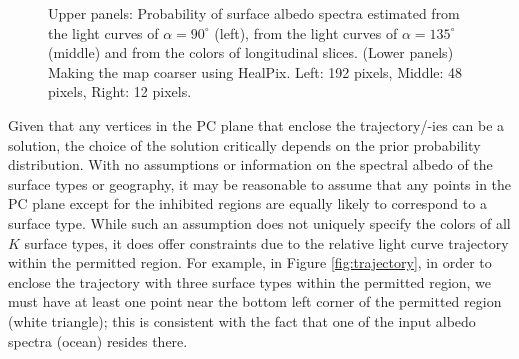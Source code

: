 \documentclass[iop,numberedappendix,apj,]{emulateapj}
\begin{document}
\begin{figure}[tbh!]
    \caption{Upper panels: Probability of surface albedo spectra estimated from the light curves of $\alpha = 90^{\circ }$ (left), from the light curves of $\alpha = 135^{\circ }$ (middle) and from the colors of longitudinal slices. (Lower panels) Making the map coarser using HealPix. Left: 192 pixels, Middle: 48 pixels, Right: 12 pixels. }
\label{fig:PCplane}
\end{figure}


Given that any vertices in the PC plane that enclose the trajectory/-ies can be a solution, the choice of the solution critically depends on the prior probability distribution. 
With no assumptions or information on the spectral albedo of the surface types or geography, it may be reasonable to assume that any points in the PC plane except for the inhibited regions are equally likely to correspond to a surface type. 
While such an assumption does not uniquely specify the colors of all $K$ surface types, it does offer constraints due to the relative light curve trajectory within the permitted region. 
For example, in Figure \ref{fig:trajectory}, in order to enclose the trajectory with three surface types within the permitted region, we must have at least one point near the bottom left corner of the permitted region (white triangle); this is consistent with the fact that one of the input albedo spectra (ocean) resides there. 
\end{document}
